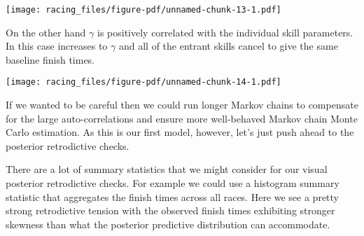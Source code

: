 \documentclass[
  letterpaper,
  DIV=11,
  numbers=noendperiod]{scrartcl}
\newenvironment{Shaded}{\begin{snugshade}}{\end{snugshade}}
\newcommand{\FunctionTok}[1]{\textcolor[rgb]{0.28,0.35,0.67}{#1}}
\newcommand{\NormalTok}[1]{\textcolor[rgb]{0.00,0.23,0.31}{#1}}
\newcommand{\SpecialCharTok}[1]{\textcolor[rgb]{0.37,0.37,0.37}{#1}}
\newcommand{\StringTok}[1]{\textcolor[rgb]{0.13,0.47,0.30}{#1}}
\begin{document}
\begin{Shaded}
\end{Shaded}

\texttt{[image: racing\_files/figure-pdf/unnamed-chunk-13-1.pdf]}

On the other hand \(\gamma\) is positively correlated with the
individual skill parameters. In this case increases to \(\gamma\) and
all of the entrant skills cancel to give the same baseline finish times.

\begin{Shaded}
\end{Shaded}

\texttt{[image: racing\_files/figure-pdf/unnamed-chunk-14-1.pdf]}

If we wanted to be careful then we could run longer Markov chains to
compensate for the large auto-correlations and ensure more well-behaved
Markov chain Monte Carlo estimation. As this is our first model,
however, let's just push ahead to the posterior retrodictive checks.

There are a lot of summary statistics that we might consider for our
visual posterior retrodictive checks. For example we could use a
histogram summary statistic that aggregates the finish times across all
races. Here we see a pretty strong retrodictive tension with the
observed finish times exhibiting stronger skewness than what the
posterior predictive distribution can accommodate.
\end{document}

